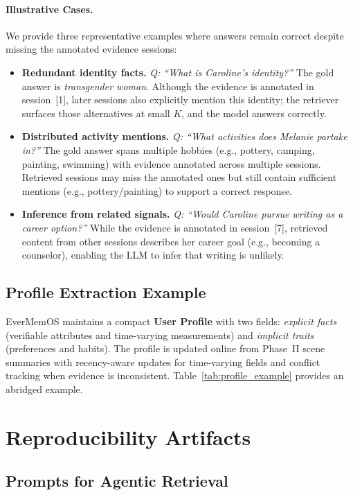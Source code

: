 \paragraph{Illustrative Cases.} We provide three representative examples where answers remain correct despite missing the annotated evidence sessions:
\begin{itemize}
\item \textbf{Redundant identity facts.} \emph{Q: ``What is Caroline's identity?''} The gold answer is \emph{transgender woman}. Although the evidence is annotated in session~[1], later sessions also explicitly mention this identity; the retriever surfaces those alternatives at small $K$, and the model answers correctly.
\item \textbf{Distributed activity mentions.} \emph{Q: ``What activities does Melanie partake in?''} The gold answer spans multiple hobbies (e.g., pottery, camping, painting, swimming) with evidence annotated across multiple sessions. Retrieved sessions may miss the annotated ones but still contain sufficient mentions (e.g., pottery/painting) to support a correct response.
\item \textbf{Inference from related signals.} \emph{Q: ``Would Caroline pursue writing as a career option?''} While the evidence is annotated in session~[7], retrieved content from other sessions describes her career goal (e.g., becoming a counselor), enabling the LLM to infer that writing is unlikely.
\end{itemize}

\subsection{Profile Extraction Example}
\label{sec:profile_example}

\noindent EverMemOS maintains a compact \textbf{User Profile} with two fields: \emph{explicit facts} (verifiable attributes and time-varying measurements) and \emph{implicit traits} (preferences and habits). The profile is updated online from Phase~II scene summaries with recency-aware updates for time-varying fields and conflict tracking when evidence is inconsistent. Table~\ref{tab:profile_example} provides an abridged example.

\section{Reproducibility Artifacts}
\label{sec:appendix_repro}

\subsection{Prompts for Agentic Retrieval}
\label{sec:agentic_prompts}

